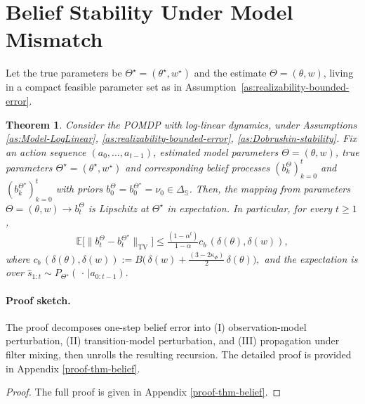 \documentclass[10pt]{article} %
\theoremstyle{plain}
\newtheorem{theorem}{Theorem}[section]
\theoremstyle{definition}
\theoremstyle{remark}
\newcommand{\bE}{\mathbb{E}}
\newcommand{\bS}{\mathbb{S}}
\begin{document}
\section{Belief Stability Under Model Mismatch}
\label{sec:belief-stability}

Let the true parameters be \(\Theta^\star=(\theta^\star,w^\star)\) and the estimate
\(\Theta=(\theta,w)\), living in a compact feasible parameter set as in
Assumption~\ref{as:realizability-bounded-error}.

 
\label{subsec:belief-expectation}

\begin{theorem}\label{thm:param-belief-lip}
Consider the POMDP with log-linear dynamics, under Assumptions
\ref{as:Model-LogLinear}, \ref{as:realizability-bounded-error}, \ref{as:Dobrushin-stability}.
Fix an action sequence $(a_0,\dots,a_{t-1})$, estimated model parameters $\Theta=(\theta,w)$, true parameters $\Theta^\star=(\theta^\star,w^\star)$ and corresponding belief processes  $(b_k^\Theta)_{k=0}^t$ and $(b_k^{\Theta^\star})_{k=0}^t$ with priors $b_0^\Theta=b_0^{\Theta^\star}=\nu_0\in\Delta_{\bS}$.
Then, the mapping from parameters $\Theta =(\theta, w)\to b_t^\Theta$ is Lipschitz at $\Theta^\star$ in expectation. In particular, for every $t\ge1$,
\begin{align}\label{eq:belief-lipschitz}
\bE\Big[\|b_{t}^\Theta-b_{t}^{\Theta^\star}\|_{\mathrm{TV}}\Big]
\le \frac{(1-\alpha^{t})}{1-\alpha}c_b\,(\delta(\theta),\delta(w)),
\end{align}
where $c_b\, (\delta(\theta),\delta(w)):=B\bigl(\,\delta(w)+\frac{(3-2\kappa_\Phi)}{2}\,\delta(\theta)\bigr),$ and the expectation is over $\hat s_{1:t}\sim P_{\Theta^\star}(\,\cdot\,|a_{0:t-1}).$
\end{theorem}

\paragraph{Proof sketch.}
The proof decomposes one-step belief error into (I) observation-model perturbation, (II) transition-model perturbation, and (III) propagation under filter mixing, then unrolls the resulting recursion. The detailed proof is provided in Appendix \ref{proof-thm-belief}.

\begin{proof}
The full proof is given in Appendix \ref{proof-thm-belief}.
\end{proof}
\end{document}
